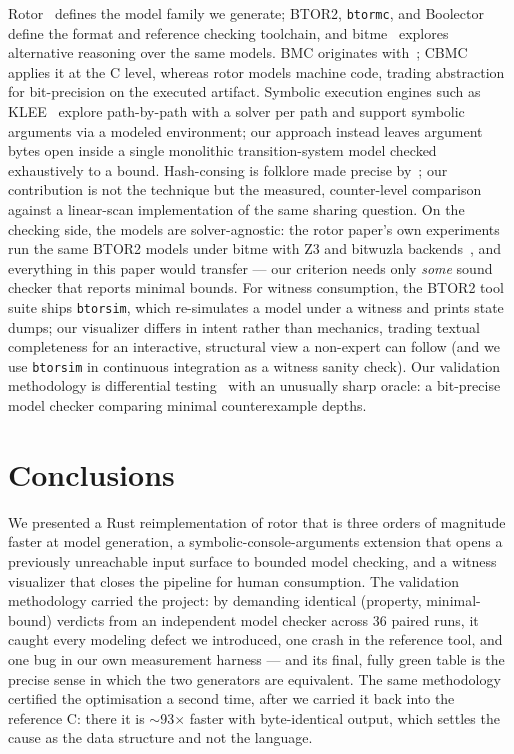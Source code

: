 \documentclass[sigplan,screen,nonacm]{acmart}
\begin{document}
Rotor~\cite{rotorpaper} defines the model family we generate; BTOR2,
\texttt{btormc}, and Boolector~\cite{btor2} define the format and
reference checking toolchain, and bitme~\cite{bitme} explores
alternative reasoning over the same models. BMC originates
with~\cite{biere1999}; CBMC~\cite{cbmc} applies it at the C level,
whereas rotor models machine code, trading abstraction for
bit-precision on the executed artifact. Symbolic execution engines such
as KLEE~\cite{klee} explore path-by-path with a solver per path and
support symbolic arguments via a modeled environment; our approach
instead leaves argument bytes open inside a single monolithic
transition-system model checked exhaustively to a bound. Hash-consing
is folklore made precise by~\cite{hashconsing}; our contribution is not
the technique but the measured, counter-level comparison against a
linear-scan implementation of the same sharing question. On the checking side, the models are solver-agnostic: the rotor
paper's own experiments run the same BTOR2 models under bitme with Z3
and bitwuzla backends~\cite{rotorpaper}, and everything in this paper
would transfer --- our criterion needs only \emph{some} sound checker
that reports minimal bounds. For witness consumption, the BTOR2 tool
suite ships \texttt{btorsim}, which re-simulates a model under a
witness and prints state dumps; our visualizer differs in intent rather
than mechanics, trading textual completeness for an interactive,
structural view a non-expert can follow (and we use \texttt{btorsim}
in continuous integration as a witness sanity check). Our validation
methodology is differential testing~\cite{mckeeman} with an unusually
sharp oracle: a bit-precise model checker comparing minimal
counterexample depths.

\section{Conclusions}

We presented a Rust reimplementation of rotor that is three orders of
magnitude faster at model generation, a symbolic-console-arguments
extension that opens a previously unreachable input surface to bounded
model checking, and a witness visualizer that closes the pipeline for
human consumption. The validation methodology carried the project: by
demanding identical (property, minimal-bound) verdicts from an
independent model checker across 36 paired runs, it caught every
modeling defect we introduced, one crash in the reference tool, and one
bug in our own measurement harness --- and its final, fully green table
is the precise sense in which the two generators are equivalent. The same
methodology certified the optimisation a second time, after we carried it
back into the reference C: there it is $\sim$93$\times$ faster with
byte-identical output, which settles the cause as the data structure and
not the language.
\end{document}
